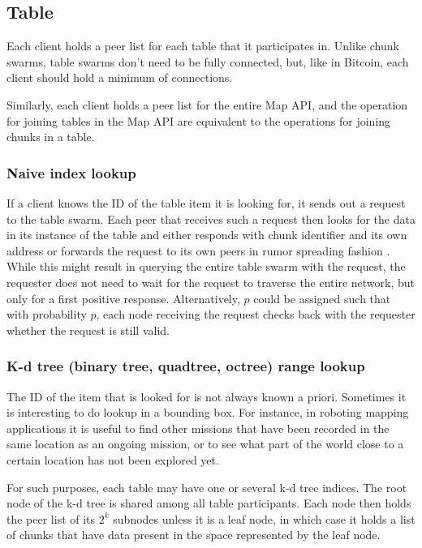 \documentclass[a4paper, 10pt, conference]{ieeeconf}
\begin{document}
\subsection{Table}

Each client holds a peer list for each table that it participates in. Unlike
chunk swarms, table swarms don't need to be fully connected, but, like in
Bitcoin, each client should hold a minimum of connections.

Similarly, each client holds a peer list for the entire Map API, and the
operation for joining tables in the Map API are equivalent to the operations for
joining chunks in a table.

\subsubsection{Naive index lookup}

If a client knows the ID of the table item it is looking for, it sends out a
request to the table swarm. Each peer that receives such a request then looks 
for the data in its instance of the table and either responds with chunk
identifier and its own address or forwards the request to its own peers in
rumor spreading fashion \cite{bitcoin}. While this might result in querying the
entire table swarm with the request, the requester does not need to wait for the
request to traverse the entire network, but only for a first positive response.
Alternatively, $p$ could be assigned such that with probability $p$, each node
receiving the request checks back with the requester whether the request is
still valid.

\subsubsection{K-d tree (binary tree, quadtree, octree) range lookup}

The ID of the item that is looked for is not always known a priori. Sometimes
it is interesting to do lookup in a bounding box. For instance, in roboting
mapping applications it is useful to find other missions that have been recorded
in the same location as an ongoing mission, or to see what part of the
world close to a certain location has not been explored yet.

For such purposes, each table may have one or several k-d tree indices.
The root node of the k-d tree is shared among all table participants. Each
node then holds the peer list of its $2^k$ subnodes unless it is a leaf node,
in which case it holds a list of chunks that have data present in the space
represented by the leaf node.
\end{document}
